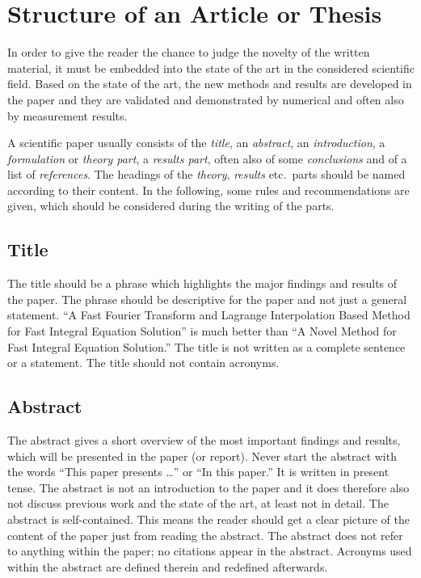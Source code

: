 \chapter{Structure of an Article or Thesis} %
In order to give the reader the chance to judge the novelty of the written material, it must be embedded into the state of the art in the considered scientific field. 
Based on the state of the art, the new methods and results are developed in the paper and they are validated and demonstrated by numerical and often also by measurement results. 

A scientific paper usually consists of the \emph{title}, an \emph{abstract}, an \emph{introduction}, a \emph{formulation} or \emph{theory part}, a \emph{results part}, often also of some \emph{conclusions} and of a list of \emph{references}. 
The headings of the \emph{theory}, \emph{results} etc.\ parts should be named according to their content.
In the following, some rules and recommendations are given, which should be considered during the writing of the parts.


\section{Title} %
The title should be a phrase which highlights the major findings and results of the paper. 
The phrase should be descriptive for the paper and not just a general statement. 
“A Fast Fourier Transform and Lagrange Interpolation Based Method for Fast Integral Equation Solution”
is much better than
“A Novel Method for Fast Integral Equation Solution.”
The title is not written as a complete sentence or a statement.
The title should not contain acronyms.

\section{Abstract} %
The abstract gives a short overview of the most important findings and results, which will be presented in the paper (or report). 
Never start the abstract with the words “This paper presents \ldots” or “In this paper.”
It is written in present tense. 
The abstract is not an introduction to the paper and it does therefore also not discuss previous work and the state of the art, at least not in detail. 
The abstract is self-contained. 
This means the reader should get a clear picture of the content of the paper just from reading the abstract.
The abstract does not refer to anything within the paper; no citations appear in the abstract. 
Acronyms used within the abstract are defined therein and redefined afterwards.

